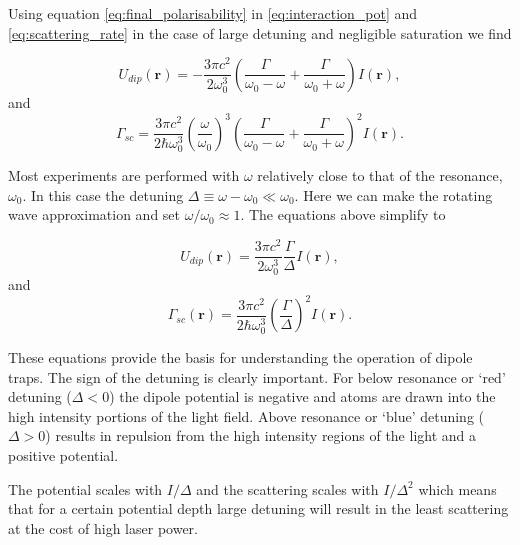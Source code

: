 Using equation \ref{eq:final_polarisability} in \ref{eq:interaction_pot} and \ref{eq:scattering_rate} in the case of large detuning and negligible saturation we find

\begin{equation}\label{eq:potential}
U_{dip}(\boldsymbol r) = -\frac{3\pi c^2}{2\omega_0^3}\left(\frac{\Gamma}{\omega_0-\omega} + \frac{\Gamma}{\omega_0+\omega}\right) I(\boldsymbol r),
\end{equation}
and
\begin{equation}\label{eq:scattering}
\Gamma_{sc} = \frac{3\pi c^2}{2\hbar\omega_0^3} \left(\frac{\omega}{\omega_0}\right)^3 \left(\frac{\Gamma}{\omega_0 - \omega} + \frac{\Gamma}{\omega_0+\omega}\right)^2 I(\boldsymbol r).
\end{equation}

Most experiments are performed with $\omega$ relatively close to that of the resonance, $\omega_0$. In this case the detuning $\Delta\equiv \omega - \omega_0 \ll \omega_0$. Here we can make the rotating wave approximation and set $\omega/\omega_0\approx 1$. The equations above simplify to

\begin{equation}\label{eq:simple_potential}
U_{dip}(\boldsymbol{r}) = \frac{3\pi c^2}{2 \omega_0^3} \frac{\Gamma}{\Delta} I(\boldsymbol{r}),
\end{equation}
and
\begin{equation}\label{eq:simple_scattering}
\Gamma_{sc} (\boldsymbol r ) = \frac{3\pi c^2}{2\hbar\omega_0^3} \left( \frac{\Gamma}{\Delta} \right)^2 I(\boldsymbol r ).
\end{equation}

These equations provide the basis for understanding the operation of dipole traps. The sign of the detuning is clearly important. For below resonance or `red' detuning ($\Delta < 0$) the dipole potential is negative and atoms are drawn into the high intensity portions of the light field. Above resonance or `blue' detuning ($\Delta > 0$) results in repulsion from the high intensity regions of the light and a positive potential.

The potential scales with $I/\Delta$ and the scattering scales with $I/\Delta^2$ which means that for a certain potential depth large detuning will result in the least scattering at the cost of high laser power.

